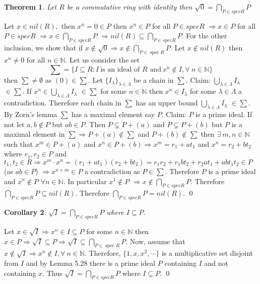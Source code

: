 \documentclass[11pt]{amsart}
\newtheorem{theorem}{Theorem}[section]
\newtheorem{corollary}[theorem]{Corollary}%
\newcommand{\NN}{\mathbb N}
\DeclareMathOperator{\spec}{\text{spec}}
\begin{document}
\begin{theorem}
Let $R$ be a commutative ring with identity then $\sqrt{0}={\displaystyle\bigcap_{P \in specR}P}$
\end{theorem}
\proof Let $x \in nil(R),$ then $x^n=0 \in P$ then  $x^n \in P$ for all $P \in specR$ $\Rightarrow x \in P$ for all $P\in specR$ $\Rightarrow x\in {\displaystyle\bigcap_{P \in specR}P}$ $\Rightarrow nil(R) \subseteq {\displaystyle\bigcap_{P \in specR}P}.$ For the other inclusion, we show that if $x\notin \sqrt{0} \Rightarrow x\notin \displaystyle\bigcap_{P\in \spec R} P.$ Let $x \notin nil(R)$ then $x^n \neq 0$ for all $n \in {\NN}.$ Let us consider the set $$\sum=\{I\subseteq R: I~\text{is an ideal of $R$ and}~x^n\notin I,\forall~n\in {\NN}\}$$ then $\sum \neq \emptyset$ as $(0) \in \sum.$ Let $\{I_{\lambda} \}_{\lambda \in \Lambda}$ be a chain in $\sum.$ Claim: $\displaystyle\bigcup_{\lambda \in \Lambda}I_{\lambda}$ $\in \sum.$ If $x^n \in \displaystyle\bigcup_{\lambda \in \Lambda}I_{\lambda}$ $\in \sum$ for some $n\in {\NN}$ then $x^n\in I_{\lambda}$
for some $\lambda \in \Lambda$ a contradiction. Therefore each chain in $\sum$ has an upper bound $\displaystyle\bigcup_{\lambda \in \Lambda}I_{\lambda}$ $\in \sum.$ By Zorn's lemma $\sum$ has a maximal element say $P.$ Claim: $P$ is a prime ideal. If not let $a,b\notin P$ but $ab \in P.$ Then $P\subsetneq P+(a)$ and $P\subsetneq P+(b)$ but $P$ is a maximal element in $\sum \Rightarrow P+(a) \notin \sum$ and $P+(b) \notin \sum$ then $\exists~m,n \in {\NN}$ such that $x^m \in P+(a)$ and $x^n \in P+(b)\Rightarrow x^m=r_{1}+at_{1}$ and $x^n=r_{2}+bt_{2}$ where $r_{1},r_{2} \in P$ and $t_{1},t_{2}\in R \Rightarrow x^m\cdot x^n=(r_{1}+at_{1})(r_{2}+bt_{2})=r_{1}r_{2}+r_{1}bt_{2}+r_{2}at_{1}+abt_{1}t_{2} \in P$ (as $ab \in P$) $\Rightarrow x^{n+m} \in P$ a contradiction as $P\in \sum.$ Therefore $P$ is a prime ideal and $x^n \notin P$ $\forall n\in {\NN}.$ In particular $x^1 \notin P$ $\Rightarrow x\notin {\displaystyle\bigcap_{P \in specR}P}.$ Therefore ${\displaystyle\bigcap_{P \in specR}P} \subseteq nil(R).$ Therefore ${\displaystyle\bigcap_{P \in specR}P}=nil(R).$ \qed
\begin{corollary} 
$\sqrt{I}={\displaystyle\bigcap_{P \in specR}P}$ where $I\subseteq P.$
\end{corollary}
\proof Let $x\in \sqrt{I} \Rightarrow x^n\in I\subseteq P$ for some $n\in {\NN}$ then $x\in P \Rightarrow \sqrt{I}\subseteq P \Rightarrow \sqrt{I} \subseteq \displaystyle\bigcap_{P\in \spec R} P$. Now, assume that $x\notin \sqrt{I} \Rightarrow x^n\notin I,\forall~n\in {\NN}.$ Therefore, $\{1,x,x^2,\cdots \}$ is a multiplicative set disjoint from $I$ and by Lemma 5.28 there is a prime ideal $P$ containing $I$ and not containing $x$. Thus $\sqrt{I}=\displaystyle\bigcap_{P \in specR}P$ where $I\subseteq P.$ \qed
\end{document}
